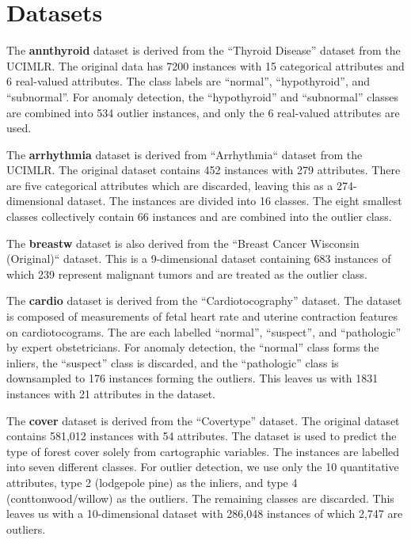 \documentclass{article}
\begin{document}
\section*{Datasets}

The \textbf{annthyroid} dataset is derived from the ``Thyroid Disease'' dataset from the UCIMLR\@.
The original data has 7200 instances with 15 categorical attributes and 6 real-valued attributes.
The class labels are ``normal'', ``hypothyroid'', and ``subnormal''.
For anomaly detection, the ``hypothyroid'' and ``subnormal'' classes are combined into 534 outlier instances, and only the 6 real-valued attributes are used.

The \textbf{arrhythmia} dataset is derived from ``Arrhythmia`` dataset from the UCIMLR\@.
The original dataset contains 452 instances with 279 attributes.
There are five categorical attributes which are discarded, leaving this as a 274-dimensional dataset.
The instances are divided into 16 classes.
The eight smallest classes collectively contain 66 instances and are combined into the outlier class.

The \textbf{breastw} dataset is also derived from the ``Breast Cancer Wisconsin (Original)`` dataset.
This is a 9-dimensional dataset containing 683 instances of which 239 represent malignant tumors and are treated as the outlier class.

The \textbf{cardio} dataset is derived from the ``Cardiotocography'' dataset.
The dataset is composed of measurements of fetal heart rate and uterine contraction features on cardiotocograms.
The are each labelled ``normal'', ``suspect'', and ``pathologic'' by expert obstetricians.
For anomaly detection, the ``normal'' class forms the inliers, the ``suspect'' class is discarded, and the ``pathologic'' class is downsampled to 176 instances forming the outliers.
This leaves us with 1831 instances with 21 attributes in the dataset.

The \textbf{cover} dataset is derived from the ``Covertype'' dataset.
The original dataset contains 581,012 instances with 54 attributes.
The dataset is used to predict the type of forest cover solely from cartographic variables.
The instances are labelled into seven different classes.
For outlier detection, we use only the 10 quantitative attributes, type 2 (lodgepole pine) as the inliers, and type 4 (conttonwood/willow) as the outliers.
The remaining classes are discarded.
This leaves us with a 10-dimensional dataset with 286,048 instances of which 2,747 are outliers.
\end{document}
